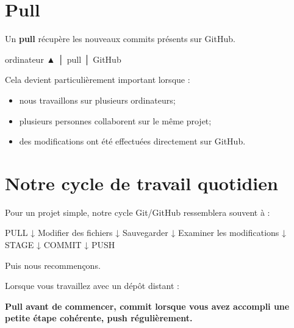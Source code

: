 \documentclass[
  letterpaper,
  DIV=11,
  numbers=noendperiod]{scrreprt}
\newenvironment{Shaded}{\begin{snugshade}}{\end{snugshade}}
\newcommand{\NormalTok}[1]{\textcolor[rgb]{0.00,0.23,0.31}{#1}}
\providecommand{\tightlist}{%
  \setlength{\itemsep}{0pt}\setlength{\parskip}{0pt}}\usepackage{longtable,booktabs,array}
\begin{document}
\section{Pull}\label{pull}

Un \textbf{pull} récupère les nouveaux commits présents sur GitHub.

\begin{Shaded}
\begin{Highlighting}[]
\NormalTok{ordinateur}
\NormalTok{    ▲}
\NormalTok{    │ pull}
\NormalTok{    │}
\NormalTok{ GitHub}
\end{Highlighting}
\end{Shaded}

Cela devient particulièrement important lorsque :

\begin{itemize}
\tightlist
\item
  nous travaillons sur plusieurs ordinateurs;
\item
  plusieurs personnes collaborent sur le même projet;
\item
  des modifications ont été effectuées directement sur GitHub.
\end{itemize}

\section{Notre cycle de travail
quotidien}\label{notre-cycle-de-travail-quotidien}

Pour un projet simple, notre cycle Git/GitHub ressemblera souvent à :

\begin{Shaded}
\begin{Highlighting}[]
\NormalTok{PULL}
\NormalTok{  ↓}
\NormalTok{Modifier des fichiers}
\NormalTok{  ↓}
\NormalTok{Sauvegarder}
\NormalTok{  ↓}
\NormalTok{Examiner les modifications}
\NormalTok{  ↓}
\NormalTok{STAGE}
\NormalTok{  ↓}
\NormalTok{COMMIT}
\NormalTok{  ↓}
\NormalTok{PUSH}
\end{Highlighting}
\end{Shaded}

Puis nous recommençons.

\begin{tcolorbox}[enhanced jigsaw, arc=.35mm, title=\textcolor{quarto-callout-tip-color}{\faLightbulb}\hspace{0.5em}{Une règle simple pour commencer}, colback=white, left=2mm, rightrule=.15mm, toptitle=1mm, opacityback=0, bottomtitle=1mm, breakable, colframe=quarto-callout-tip-color-frame, coltitle=black, toprule=.15mm, titlerule=0mm, opacitybacktitle=0.6, bottomrule=.15mm, colbacktitle=quarto-callout-tip-color!10!white, leftrule=.75mm]

Lorsque vous travaillez avec un dépôt distant :

\textbf{Pull avant de commencer, commit lorsque vous avez accompli une
petite étape cohérente, push régulièrement.}

\end{tcolorbox}
\end{document}
